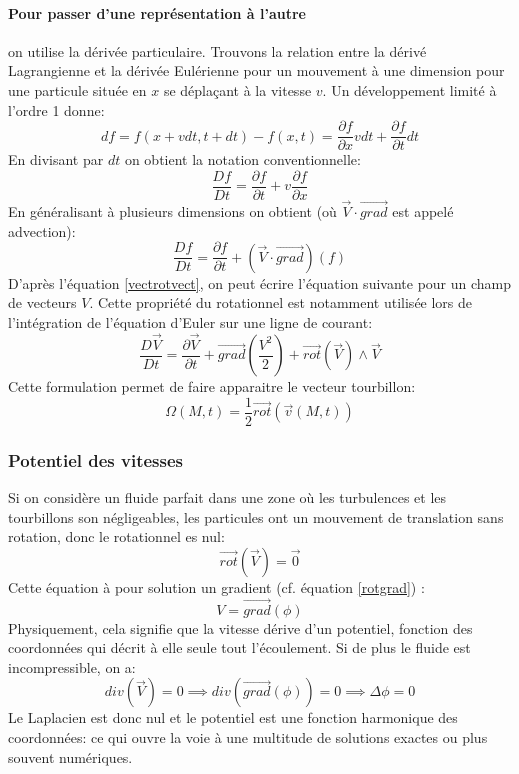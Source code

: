 \documentclass[10pt,a4paper]{article}
\begin{document}
\paragraph{Pour passer d'une représentation à l'autre} on utilise la dérivée particulaire. Trouvons la relation entre la dérivé Lagrangienne et la dérivée Eulérienne pour un mouvement à une dimension pour une particule située en $x$ se déplaçant à la vitesse $v$. Un développement limité à l'ordre 1 donne:
\begin{equation}
df = f(x+vdt, t+dt) - f(x, t) = \frac{\partial f}{\partial x} vdt + \frac{\partial f}{\partial t} dt
\end{equation}
En divisant par $dt$ on obtient la notation conventionnelle:
\begin{equation}
\frac{Df}{Dt} = \frac{\partial f}{\partial t} + v \frac{\partial f}{\partial x}
\end{equation}
En généralisant à plusieurs dimensions on obtient (où $\overrightarrow{V}\cdot\overrightarrow{grad}$ est appelé advection\cite{advection}):
\begin{equation}
\frac{Df}{Dt} = \frac{\partial f}{\partial t} + (\overrightarrow{V}\cdot\overrightarrow{grad})(f)
\end{equation}
D'après l'équation \ref{vectrotvect}, on peut écrire l'équation suivante pour un champ de vecteurs $V$. Cette propriété du rotationnel est notamment utilisée lors de l'intégration de l'équation d'Euler sur une ligne de courant:
\begin{equation}
\frac{D\overrightarrow{V}}{Dt} = \frac{\partial \overrightarrow{V}}{\partial t} + \overrightarrow{grad}(\frac{V^{2}}{2}) + \overrightarrow{rot}(\overrightarrow{V}) \land \overrightarrow{V} 
\end{equation}
Cette formulation permet de faire apparaitre le vecteur tourbillon:
\begin{equation}
\Omega(M,t) = \frac{1}{2}\overrightarrow{rot}(\overrightarrow{v}(M,t))
\end{equation}

\subsubsection{Potentiel des vitesses}
Si on considère un fluide parfait dans une zone où les turbulences et les tourbillons son négligeables, les particules ont un mouvement de translation sans rotation, donc le rotationnel es nul:
\[ \overrightarrow{rot}(\overrightarrow{V}) = \overrightarrow{0}\]
Cette équation à pour solution un gradient (cf. équation \ref{rotgrad}) :
\[ V = \overrightarrow{grad}(\phi) \]
Physiquement, cela signifie que la vitesse dérive d'un potentiel, fonction des coordonnées qui décrit à elle seule tout l'écoulement. Si de plus le fluide est incompressible, on a:
\[ div(\overrightarrow{V}) = 0 \implies div(\overrightarrow{grad}(\phi)) = 0 \implies \Delta \phi = 0 \]
Le Laplacien est donc nul et le potentiel est une fonction harmonique des coordonnées: ce qui ouvre la voie à une multitude de solutions exactes ou plus souvent numériques.
\end{document}

